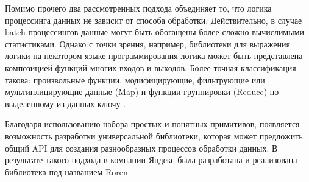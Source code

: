 Помимо прочего два рассмотренных подхода объединяет то, что логика процессинга данных не зависит от способа обработки. Действительно, в случае batch процессингов данные могут быть обогащены более сложно вычислимыми статистиками. Однако с точки зрения, например, библиотеки для выражения логики на некотором языке программирования логика может быть представлена композицией функций многих входов и выходов. Более точная классификация такова: произвольные функции, модифицирующие, фильтрующие или мультиплицирующие данные (Map) и функции группировки (Reduce) по выделенному из данных ключу \cite{mapreduce}.

Благодаря использованию набора простых и понятных примитивов, появляется возможность разработки универсальной библиотеки, которая может предложить общий API для создания разнообразных процессов обработки данных. В результате такого подхода в компании Яндекс была разработана и реализована библиотека под названием Roren \cite{roren}.

\newpage


\newpage


\newpage

